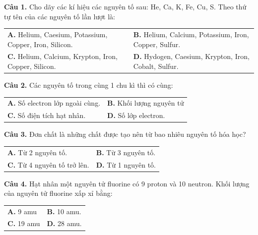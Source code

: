 \documentclass{article}
\begin{document}
\fontsize{26}{34}\selectfont

\textbf{Câu 1.} Cho dãy các kí hiệu các nguyên tố sau: He, Ca, K, Fe, Cu, S. Theo thứ tự tên của các nguyên tố lần lượt là:
\vspace{6pt}

\begin{tabularx}{\linewidth}{@{}X X@{}}
\textbf{A.} Helium, Caesium, Potassium, Copper, Iron, Silicon. & \textbf{B.} Helium, Calcium, Potassium, Iron, Copper, Sulfur.\\[8pt]
\textbf{C.} Helium, Calcium, Krypton, Iron, Copper, Silicon. & \textbf{D.} Hydogen, Caesium, Krypton, Iron, Cobalt, Sulfur.
\end{tabularx}

\vspace*{\fill}

\textbf{Câu 2.} Các nguyên tố trong cùng 1 chu kì thì có cùng:
\vspace{6pt}

\begin{tabularx}{\linewidth}{@{}X X@{}}
\textbf{A.} Số electron lớp ngoài cùng. & \textbf{B.} Khối lượng nguyên tử\\[8pt]
\textbf{C.} Số điện tích hạt nhân. & \textbf{D.} Số lớp electron.
\end{tabularx}

\newpage

\fontsize{26}{34}\selectfont

\textbf{Câu 3.} Đơn chất là những chất được tạo nên từ bao nhiêu nguyên tố hóa học?
\vspace{6pt}

\begin{tabularx}{\linewidth}{@{}X X@{}}
\textbf{A.} Từ 2 nguyên tố. & \textbf{B.} Từ 3 nguyên tố.\\[8pt]
\textbf{C.} Từ 4 nguyên tố trở lên. & \textbf{D.} Từ 1 nguyên tố.
\end{tabularx}

\vspace*{\fill}

\textbf{Câu 4.} Hạt nhân một nguyên tử fluorine có 9 proton và 10 neutron. Khối lượng của nguyên tử fluorine xấp xỉ bằng:
\vspace{6pt}

\begin{tabularx}{\linewidth}{@{}X X@{}}
\textbf{A.} 9 amu & \textbf{B.} 10 amu.\\[8pt]
\textbf{C.} 19 amu & \textbf{D.} 28 amu.
\end{tabularx}
\end{document}
